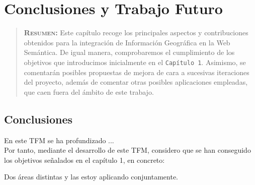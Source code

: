 

\chapter{Conclusiones y Trabajo Futuro}
\label{ch:Conclusiones y Trabajo Futuro}

\begin{quote}
  {\bf\textsc{Resumen:}} Este capítulo recoge los principales aspectos y contribuciones obtenidos para la integración de Información Geográfica en la Web Semántica. De igual manera, comprobaremos el cumplimiento de los objetivos que introducimos inicialmente en el \texttt{Capítulo 1}. Asimismo, se comentarán posibles propuestas de mejora de cara a sucesivas iteraciones del proyecto, además de comentar otras posibles aplicaciones empleadas, que caen fuera del ámbito de este trabajo.
\end{quote}




\section{Conclusiones}

En este TFM se ha profundizado ... \\


Por tanto, mediante el desarrollo de este TFM, considero que se han conseguido los objetivos señalados en el capítulo 1, en concreto:


Dos áreas distintas  y las estoy aplicando conjuntamente.

